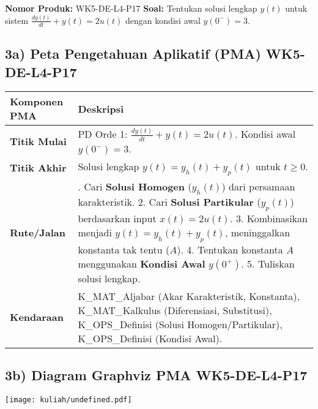 \documentclass[
  letterpaper,
  DIV=11,
  numbers=noendperiod]{scrreprt}
\begin{document}
\textbf{Nomor Produk:} WK5-DE-L4-P17 \textbf{Soal:} Tentukan solusi
lengkap \(y(t)\) untuk sistem \(\frac{dy(t)}{dt} + y(t) = 2u(t)\) dengan
kondisi awal \(y(0^-) = 3\).

\subsection{3a) Peta Pengetahuan Aplikatif (PMA)
WK5-DE-L4-P17}\label{a-peta-pengetahuan-aplikatif-pma-wk5-de-l4-p17}

\begin{longtable}[]{@{}
  >{\raggedright\arraybackslash}p{}
  >{\raggedright\arraybackslash}p{}@{}}
\toprule\noalign{}
\begin{minipage}[b]{\linewidth}\raggedright
Komponen PMA
\end{minipage} & \begin{minipage}[b]{\linewidth}\raggedright
Deskripsi
\end{minipage} \\
\midrule\noalign{}
\endhead
\bottomrule\noalign{}
\endlastfoot
\textbf{Titik Mulai} & PD Orde 1: \(\frac{dy(t)}{dt} + y(t) = 2u(t)\).
Kondisi awal \(y(0^-) = 3\). \\
\textbf{Titik Akhir} & Solusi lengkap \(y(t) = y_h(t) + y_p(t)\) untuk
\(t \ge 0\). \\
\textbf{Rute/Jalan} & 1. Cari \textbf{Solusi Homogen} (\(y_h(t)\)) dari
persamaan karakteristik. 2. Cari \textbf{Solusi Partikular} (\(y_p(t)\))
berdasarkan input \(x(t) = 2u(t)\). 3. Kombinasikan menjadi
\(y(t) = y_h(t) + y_p(t)\), meninggalkan konstanta tak tentu (\(A\)). 4.
Tentukan konstanta \(A\) menggunakan \textbf{Kondisi Awal} \(y(0^+)\).
5. Tuliskan solusi lengkap. \\
\textbf{Kendaraan} & K\_MAT\_Aljabar (Akar Karakteristik, Konstanta),
K\_MAT\_Kalkulus (Diferensiasi, Substitusi), K\_OPS\_Definisi (Solusi
Homogen/Partikular), K\_OPS\_Definisi (Kondisi Awal). \\
\end{longtable}

\subsection{3b) Diagram Graphviz PMA
WK5-DE-L4-P17}\label{b-diagram-graphviz-pma-wk5-de-l4-p17}

\texttt{[image: kuliah/undefined.pdf]}
\end{document}
